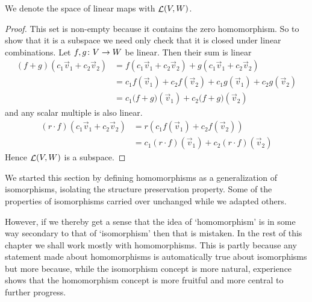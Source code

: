 \noindent We denote the space of linear maps with
\( \mathop{{\cal L}}(V,W) \).

\begin{proof}
This set is non-empty because it contains the zero homomorphism.
So to show that it is a subspace we need only check that it is 
closed under linear combinations.
Let \( \mbox{$f,g\colon V\to W$} \) be linear. 
Then their sum is linear
\begin{align*}
   (f+g)(c_1\vec{v}_1+c_2\vec{v}_2)
   &=f(c_1\vec{v}_1+c_2\vec{v}_2) + 
   g(c_1\vec{v}_1+c_2\vec{v}_2)       \\
   &=c_1f(\vec{v}_1)+c_2f(\vec{v}_2)
   +c_1g(\vec{v}_1)+c_2g(\vec{v}_2)   \\
   &=c_1\bigl(f+g\bigr)(\vec{v}_1)+c_2\bigl(f+g\bigr)(\vec{v}_2)
\end{align*}
and any scalar multiple is also linear.
\begin{align*}
   (r\cdot f)(c_1\vec{v}_1+c_2\vec{v}_2)
   &=r(c_1f(\vec{v}_1)+c_2f(\vec{v}_2))  \\
   &=c_1(r\cdot f)(\vec{v}_1)+c_2(r\cdot f)(\vec{v}_2)
\end{align*}
Hence \( \mathop{{\cal L}}(V,W) \) is a subspace.
\end{proof}

We started this section by 
defining homomorphisms as a generalization of isomorphisms,
isolating the structure preservation property.
Some of the properties of isomorphisms carried over unchanged
while we adapted others.

However, if we thereby get a sense that 
the idea of 
`homomorphism' is in some way secondary to
that of `isomorphism' then that is mistaken.
In the rest of this chapter we shall work mostly with homomorphisms.
This is
partly because any statement made about homomorphisms is automatically true 
about isomorphisms but more because, 
while the isomorphism concept is more natural, 
experience shows that the homomorphism concept 
is more fruitful and more central to further progress.

